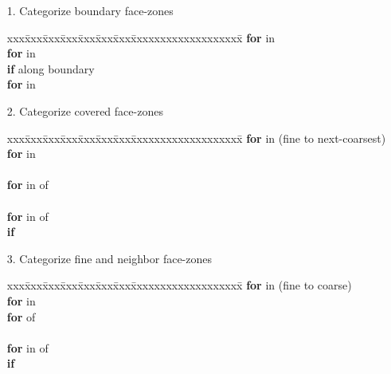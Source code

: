 \documentclass[10pt]{article}
\begin{document}
\begin{itemize}
\item[1.] Categorize boundary face-zones
\begin{tabbing}
xxx\=xxx\=xxx\=xxx\=xxx\=xxx\=xxx\=xxxxxxxxxxxxxxxxxxx\=\kill
\> \textbf{for}  in  \\
\>\> \textbf{for}  in  \\
\>\>\> \textbf{if}  along boundary \\
\>\>\>\> \textbf{for}  in  \\
\>\>\>\>\> 
\end{tabbing}
\item[2.] Categorize covered face-zones
\begin{tabbing}
xxx\=xxx\=xxx\=xxx\=xxx\=xxx\=xxx\=xxxxxxxxxxxxxxxxxxx\=\kill
\> \textbf{for}  in  (fine to next-coarsest) \\
\>\> \textbf{for}  in  \\
\>\>\>  \\
\>\>\>\> \textbf{for}  in  of \\
\>\>\>\>\>      \\
\>\>\>\> \textbf{for}  in  of \\
\>\>\>\>\>     \textbf{if}  \\
\>\>\>\>\>\> 
\end{tabbing}
\item[3.] Categorize fine and neighbor face-zones
\begin{tabbing}
xxx\=xxx\=xxx\=xxx\=xxx\=xxx\=xxx\=xxxxxxxxxxxxxxxxxxx\=\kill
\> \textbf{for}  in  (fine to coarse) \\
\>\> \textbf{for}  in  \\
\>\>\> \textbf{for}  of  \\
\>\>\>\>  \\
\>\>\>\> \textbf{for}  in  of \\
\>\>\>\>\> \textbf{if}  \\

\end{tabbing}
\end{itemize}
\end{document}
